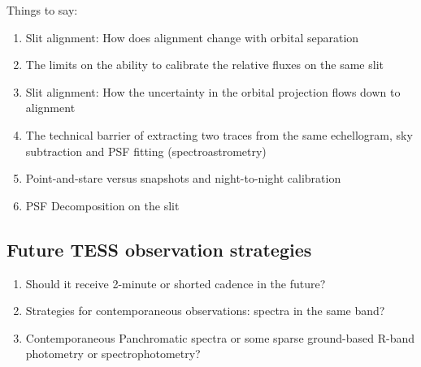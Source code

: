 \documentclass[modern]{aastex631}
\begin{document}
Things to say:  
\begin{enumerate}
  \item Slit alignment: How does alignment change with orbital separation  
  \item The limits on the ability to calibrate the relative fluxes on the same slit  
  \item Slit alignment: How the uncertainty in the orbital projection flows down to alignment  
  \item The technical barrier of extracting two traces from the same echellogram, sky subtraction and PSF fitting (spectroastrometry)  
  \item Point-and-stare versus snapshots and night-to-night calibration 
  \item PSF Decomposition on the slit  
\end{enumerate}

\subsection{Future TESS observation strategies}
\begin{enumerate}
  \item Should it receive 2-minute or shorted cadence in the future? 
  \item Strategies for contemporaneous observations: spectra in the same band?  
  \item Contemporaneous Panchromatic spectra or some sparse ground-based R-band photometry or spectrophotometry?
\end{enumerate}
\end{document}

